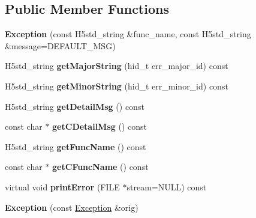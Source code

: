\subsection*{Public Member Functions}
\begin{DoxyCompactItemize}
\item 
\mbox{\label{class_h5_1_1_exception_a0f4ddd03c9177ca8c318f17e588cd713}} 
{\bfseries Exception} (const H5std\+\_\+string \&func\+\_\+name, const H5std\+\_\+string \&message=D\+E\+F\+A\+U\+L\+T\+\_\+\+M\+SG)
\item 
\mbox{\label{class_h5_1_1_exception_a232ec557c7bfba918b21d65802e27fa1}} 
H5std\+\_\+string {\bfseries get\+Major\+String} (hid\+\_\+t err\+\_\+major\+\_\+id) const
\item 
\mbox{\label{class_h5_1_1_exception_a6c7eef2706697be3b8c113cddd338f8b}} 
H5std\+\_\+string {\bfseries get\+Minor\+String} (hid\+\_\+t err\+\_\+minor\+\_\+id) const
\item 
\mbox{\label{class_h5_1_1_exception_a0d66dbcbc91c6ae539ad0ec5d2839c16}} 
H5std\+\_\+string {\bfseries get\+Detail\+Msg} () const
\item 
\mbox{\label{class_h5_1_1_exception_a198a6b260de0cdcab9e2044720214391}} 
const char $\ast$ {\bfseries get\+C\+Detail\+Msg} () const
\item 
\mbox{\label{class_h5_1_1_exception_ad557951533dc13f1e59171ccaf2e1f16}} 
H5std\+\_\+string {\bfseries get\+Func\+Name} () const
\item 
\mbox{\label{class_h5_1_1_exception_a09ff40e025d5a10472d26b0b1affd3d5}} 
const char $\ast$ {\bfseries get\+C\+Func\+Name} () const
\item 
\mbox{\label{class_h5_1_1_exception_a04328331cf6cfc4272181220b21c090f}} 
virtual void {\bfseries print\+Error} (F\+I\+LE $\ast$stream=N\+U\+LL) const
\item 
\mbox{\label{class_h5_1_1_exception_abc3b9e76dbfbdc6fc7939c67d3cfe72b}} 
{\bfseries Exception} (const \hyperlink{class_h5_1_1_exception}{Exception} \&orig)

\end{DoxyCompactItemize}
